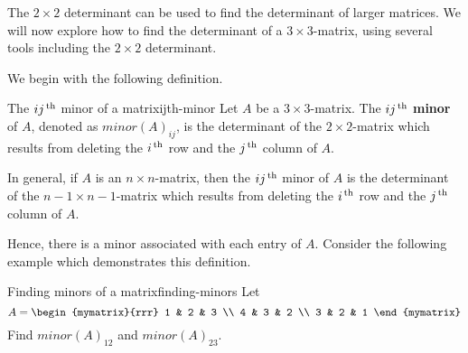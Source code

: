 The $2\times 2$ determinant can be used to find the determinant of
larger matrices.  We will now explore how to find the determinant of a
$3\times 3$-matrix, using several tools including the $2\times 2$
determinant.

We begin with the following definition. 

\begin{definition}{The $ij^{\,\rm th}$ minor of a matrix}{ijth-minor}
  Let $A$ be a $3\times 3$-matrix. The $ij^{\,\rm th}$
  \textbf{minor} of $A$, denoted as
  $minor(A) _{ij}$, is the determinant of the $2\times 2$-matrix which
  results from deleting the $i^{\,\rm th}$ row and the $j^{\,\rm th}$ column of
  $A$.

  In general, if $A$ is an $n\times n$-matrix, then the $ij^{\,\rm th}$
  minor of $A$ is the determinant of the $n-1\times n-1$-matrix which
  results from deleting the $i^{\,\rm th}$ row and the $j^{\,\rm th}$ column of
  $A$.
\end{definition}

Hence, there is a minor associated with each entry of $A$. Consider
the following example which demonstrates this definition.

\begin{example}{Finding minors of a matrix}{finding-minors}
  Let 
  \begin{equation*}
    A = \begin{mymatrix}{rrr}
      1 & 2 & 3 \\
      4 & 3 & 2 \\
      3 & 2 & 1
    \end{mymatrix} 
  \end{equation*}
  Find $minor(A) _{12}$ and $minor(A) _{23}$.
\end{example}

